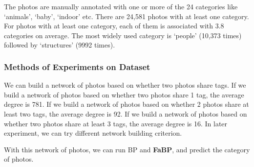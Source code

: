 The photos are manually annotated with one or more of the 24 categories like ‘animals’, ‘baby’, ‘indoor’ etc. There are 24,581 photos with at least one category. For photos with at least one category, each of them is associated with 3.8 categories on average.  The most widely used category is ‘people’ (10,373 times) followed by ‘structures’ (9992 times). 

\subsubsection*{Methods of Experiments on Dataset}
We can build a network of photos based on whether two photos share tags. If we build a network of photos based on whether two photos share 1 tag, the average degree is 781. If we build a network of photos based on whether 2 photos share at least two tags, the average degree is 92. If we build a network of photos based on whether two photos share at least 3 tags, the average degree is 16. In later experiment, we can try different network building criterion.

With this network of photos, we can run BP and \textbf{FaBP}, and predict the category of photos.

